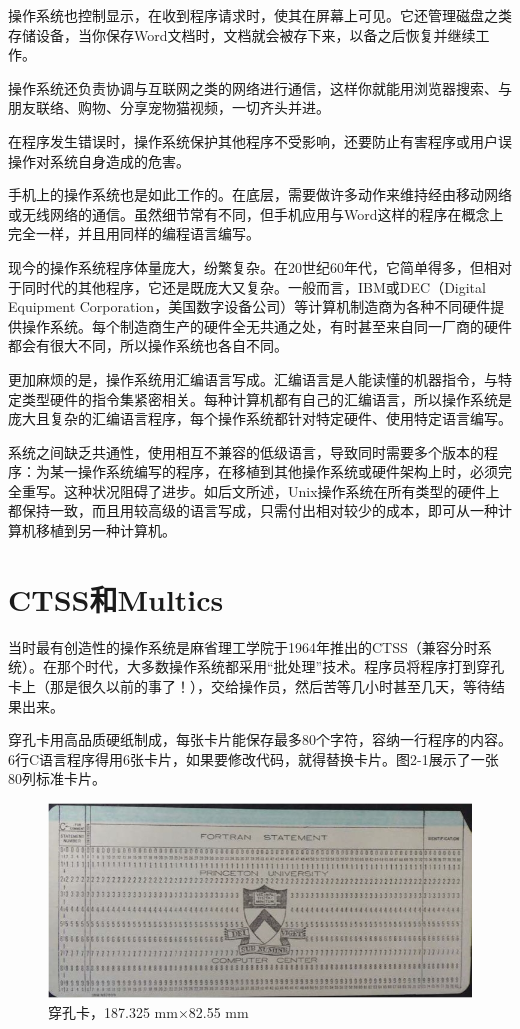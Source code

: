 \documentclass[a4paper,12pt,UTF8,twoside]{ctexbook}
\begin{document}
操作系统也控制显示，在收到程序请求时，使其在屏幕上可见。它还管理磁盘之类存储设备，当你保存Word文档时，文档就会被存下来，以备之后恢复并继续工作。

操作系统还负责协调与互联网之类的网络进行通信，这样你就能用浏览器搜索、与朋友联络、购物、分享宠物猫视频，一切齐头并进。

在程序发生错误时，操作系统保护其他程序不受影响，还要防止有害程序或用户误操作对系统自身造成的危害。

手机上的操作系统也是如此工作的。在底层，需要做许多动作来维持经由移动网络或无线网络的通信。虽然细节常有不同，但手机应用与Word这样的程序在概念上完全一样，并且用同样的编程语言编写。

现今的操作系统程序体量庞大，纷繁复杂。在20世纪60年代，它简单得多，但相对于同时代的其他程序，它还是既庞大又复杂。一般而言，IBM或DEC（Digital Equipment Corporation，美国数字设备公司）等计算机制造商为各种不同硬件提供操作系统。每个制造商生产的硬件全无共通之处，有时甚至来自同一厂商的硬件都会有很大不同，所以操作系统也各自不同。

更加麻烦的是，操作系统用汇编语言写成。汇编语言是人能读懂的机器指令，与特定类型硬件的指令集紧密相关。每种计算机都有自己的汇编语言，所以操作系统是庞大且复杂的汇编语言程序，每个操作系统都针对特定硬件、使用特定语言编写。

系统之间缺乏共通性，使用相互不兼容的低级语言，导致同时需要多个版本的程序：为某一操作系统编写的程序，在移植到其他操作系统或硬件架构上时，必须完全重写。这种状况阻碍了进步。如后文所述，Unix操作系统在所有类型的硬件上都保持一致，而且用较高级的语言写成，只需付出相对较少的成本，即可从一种计算机移植到另一种计算机。

\section{CTSS和Multics}

当时最有创造性的操作系统是麻省理工学院于1964年推出的CTSS（兼容分时系统）。在那个时代，大多数操作系统都采用“批处理”技术。程序员将程序打到穿孔卡上（那是很久以前的事了！），交给操作员，然后苦等几小时甚至几天，等待结果出来。

穿孔卡用高品质硬纸制成，每张卡片能保存最多80个字符，容纳一行程序的内容。6行C语言程序得用6张卡片，如果要修改代码，就得替换卡片。图2-1展示了一张80列标准卡片。

\begin{figure}[htbp]
	\centering
	\includegraphics[width=0.7\linewidth]{13}
	\caption{穿孔卡，187.325 mm×82.55 mm}
	\label{fig:1}
\end{figure}
\end{document}
